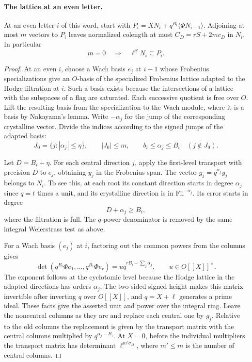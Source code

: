 \paragraph{The lattice at an even letter.}
\begin{lemma}
\label{lem:thick-even-covolume}
At an even letter \(i\) of this word, start with
\(P_i=XN_i+q^{B_i}\langle\Phi N_{i-1}\rangle\).
Adjoining at most \(m\) vectors to \(P_i\) leaves normalized
colength at most \(C_D=rS+2mc_D\) in \(N_i\).
In particular
\[
 m=0\quad\Longrightarrow\quad\ell^S N_i\subseteq P_i.
\]
\end{lemma}

\begin{proof}
At an even \(i\), choose a Wach basis \(e_j\) at \(i-1\) whose
Frobenius specializations give an \(O\)-basis of the specialized
Frobenius lattice adapted to the Hodge filtration at \(i\).
Such a basis exists because the intersections of a lattice
with the subspaces of a flag are saturated. Each successive
quotient is free over \(O\). Lift the resulting basis from
the specialization to the Wach module, where it is a basis
by Nakayama's lemma. Write \(-\alpha_j\) for the jump of the
corresponding crystalline vector. Divide the indices according to the signed jumps of the adapted basis:
\[
 J_0=\{j:|\alpha_j|\le\eta\},\qquad |J_0|\le m,\qquad b_i\le\alpha_j\le B_i\quad(j\notin J_0).
\]


Let \(D=B_i+\eta\). For each central direction \(j\), apply the
first-level transport with precision \(D\) to \(e_j\), obtaining
\(y_j\) in the Frobenius span. The vector \(g_j=q^{\alpha_j}y_j\)
belongs to \(N_i\). To see this, at each root its constant
direction starts in degree \(\alpha_j\) since \(q=t\) times
a unit, and its crystalline direction is in
\(\mathrm{Fil}^{-\alpha_j}\). Its error starts in degree
\[
 D+\alpha_j\ge B_i,
\]
where the filtration is full.
The \(q\)-power denominator is removed by the same integral
Weierstrass test as above.

For a Wach basis \((e_j)\) at \(i\), factoring out the common powers from the columns gives
\[
 \det(q^{B_i}\Phi e_1,\ldots,q^{B_i}\Phi e_r)
       =u q^{rB_i-\sum_j\alpha_j},\qquad u\in O[[X]]^\times .
\] The exponent follows at the
cyclotomic level because the Hodge lattice in the adapted
directions has orders \(\alpha_j\).
The two-sided signed height makes this matrix invertible
after inverting \(q\) over \(O[[X]]\), and \(q=X+\ell\)
generates a prime ideal. These facts give the asserted unit
and power over the integral ring. Leave the noncentral
columns as they are and replace each central one by \(g_j\).
Relative to the old columns the replacement is given by the
transport matrix with the central columns multiplied by
\(q^{\alpha_j-B_i}\). At \(X=0\), before the individual
multipliers the transport matrix has determinant
\(\ell^{m'\sigma_D}\),
where \(m'\le m\) is the number of central columns.


\end{proof}
